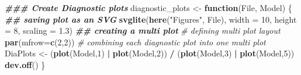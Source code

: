 \documentclass[
]{article}
\newenvironment{Shaded}{\begin{snugshade}}{\end{snugshade}}
\newcommand{\AttributeTok}[1]{\textcolor[rgb]{0.13,0.29,0.53}{#1}}
\newcommand{\CommentTok}[1]{\textcolor[rgb]{0.56,0.35,0.01}{\textit{#1}}}
\newcommand{\ControlFlowTok}[1]{\textcolor[rgb]{0.13,0.29,0.53}{\textbf{#1}}}
\newcommand{\DecValTok}[1]{\textcolor[rgb]{0.00,0.00,0.81}{#1}}
\newcommand{\DocumentationTok}[1]{\textcolor[rgb]{0.56,0.35,0.01}{\textbf{\textit{#1}}}}
\newcommand{\FloatTok}[1]{\textcolor[rgb]{0.00,0.00,0.81}{#1}}
\newcommand{\FunctionTok}[1]{\textcolor[rgb]{0.13,0.29,0.53}{\textbf{#1}}}
\newcommand{\NormalTok}[1]{#1}
\newcommand{\OtherTok}[1]{\textcolor[rgb]{0.56,0.35,0.01}{#1}}
\newcommand{\SpecialCharTok}[1]{\textcolor[rgb]{0.81,0.36,0.00}{\textbf{#1}}}
\newcommand{\StringTok}[1]{\textcolor[rgb]{0.31,0.60,0.02}{#1}}
\begin{document}
\begin{Shaded}
\begin{Highlighting}[]
\DocumentationTok{\#\#\# Create Diagnostic plots}
\NormalTok{diagnostic\_plots }\OtherTok{\textless{}{-}} \ControlFlowTok{function}\NormalTok{(File, Model) \{}
  \DocumentationTok{\#\# saving plot as an SVG}
  \FunctionTok{svglite}\NormalTok{(}\FunctionTok{here}\NormalTok{(}\StringTok{"Figures"}\NormalTok{, File), }\AttributeTok{width =} \DecValTok{10}\NormalTok{,}
          \AttributeTok{height =} \DecValTok{8}\NormalTok{,}
          \AttributeTok{scaling =} \FloatTok{1.3}\NormalTok{)}
  \DocumentationTok{\#\# creating a multi plot}
  \CommentTok{\# defining multi plot layout}
  \FunctionTok{par}\NormalTok{(}\AttributeTok{mfrow=}\FunctionTok{c}\NormalTok{(}\DecValTok{2}\NormalTok{,}\DecValTok{2}\NormalTok{))}
  \CommentTok{\# combining each diagnostic plot into one multi plot}
\NormalTok{  DiaPlots }\OtherTok{\textless{}{-}}\NormalTok{ (}\FunctionTok{plot}\NormalTok{(Model,}\DecValTok{1}\NormalTok{) }\SpecialCharTok{|} \FunctionTok{plot}\NormalTok{(Model,}\DecValTok{2}\NormalTok{)) }\SpecialCharTok{/}\NormalTok{ (}\FunctionTok{plot}\NormalTok{(Model,}\DecValTok{3}\NormalTok{) }\SpecialCharTok{|} \FunctionTok{plot}\NormalTok{(Model,}\DecValTok{5}\NormalTok{))}
  \FunctionTok{dev.off}\NormalTok{()}
\NormalTok{\}}


\end{Highlighting}
\end{Shaded}
\end{document}
